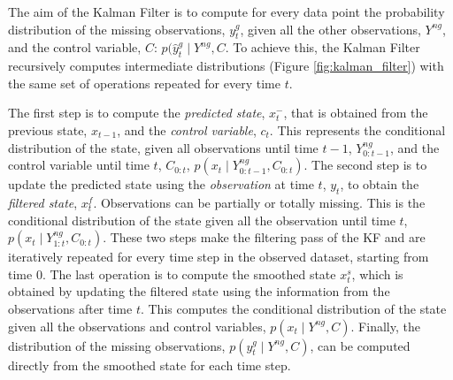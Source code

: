 \documentclass{article}
\begin{document}
The aim of the Kalman Filter is to compute for every data point the probability distribution of the missing observations, $y^g_t$, given all the other observations, $Y^{ng}$, and the control variable, $C$: $p(\hat{y}^g_t \mid Y^{ng}, C$. To achieve this, the Kalman Filter recursively computes intermediate distributions (Figure \ref{fig:kalman_filter}) with the same set of operations repeated for every time $t$.

The first step is to compute the \textit{predicted state}, $x^-_t$, that is obtained from the previous state, $x_{t-1}$, and the \textit{control variable}, $c_t$. This represents the conditional distribution of the state, given all observations until time $t-1$, $Y^{ng}_{0:t-1}$, and the control variable until time $t$, $C_{0:t}$, $p(x_t \mid Y^{ng}_{0:t-1}, C_{0:t})$.
The second step is to update the predicted state using the \textit{observation} at time $t$, $y_t$, to obtain the \textit{filtered state}, $x^f_t$. Observations can be partially or totally missing. This is the conditional distribution of the state given all the observation until time $t$, $p(x_t \mid Y^{ng}_{1:t}, C_{0:t})$.
These two steps make the filtering pass of the KF and are iteratively repeated for every time step in the observed dataset, starting from time $0$.
The last operation is to compute the smoothed state $x^s_t$, which is obtained by updating the filtered state using the information from the observations after time $t$. This computes the conditional distribution of the state given all the observations and control variables, $p(x_t \mid Y^{ng}, C)$.
Finally, the distribution of the missing observations, $p(y^g_t \mid Y^{ng}, C)$, can be computed directly from the smoothed state for each time step.
\end{document}
